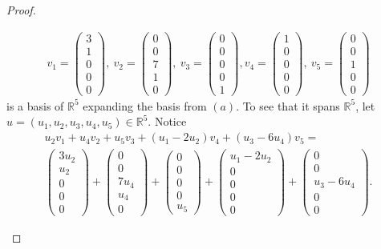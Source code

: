 \documentclass{extarticle}
\newcommand{\R}{\mathbb{R}}
\begin{document}
\begin{proof}
\begin{enumerate}[(a)]
\begin{align*}
v_1 = \begin{pmatrix}3\\1\\0\\0\\0\end{pmatrix}, ~ v_2 = \begin{pmatrix}0\\0\\7\\1\\0\end{pmatrix}, ~ v_3 = \begin{pmatrix}0\\0\\0\\0\\1\end{pmatrix}, v_4 = \begin{pmatrix}1\\0\\0\\0\\0\end{pmatrix}, ~v_5 = \begin{pmatrix}0\\0\\1\\0\\0\end{pmatrix}
\end{align*}
is a basis of $\R^5$ expanding the basis from $(a)$.  To see that it spans $\R^5$, let $u=(u_1,u_2,u_3,u_4,u_5)\in\R^5$.  Notice 
\begin{multline*}
u_2v_1 + u_4v_2 + u_5v_3+ (u_1 - 2u_2)v_4 + (u_3 - 6u_4)v_5 = \\
\begin{pmatrix} 3u_2 \\ u_2 \\ 0 \\ 0\\ 0 \end{pmatrix} + \begin{pmatrix} 0 \\ 0 \\ 7u_4 \\ u_4 \\ 0 \end{pmatrix} + \begin{pmatrix} 0 \\ 0 \\ 0 \\ 0 \\ u_5 \end{pmatrix} + \begin{pmatrix} u_1 -2u_2\\ 0 \\ 0 \\ 0 \\ 0 \end{pmatrix} + \begin{pmatrix} 0 \\ 0 \\ u_3 - 6u_4 \\ 0 \\ 0 \end{pmatrix}.

\end{multline*}
\end{enumerate}
\end{proof}
\end{document}
